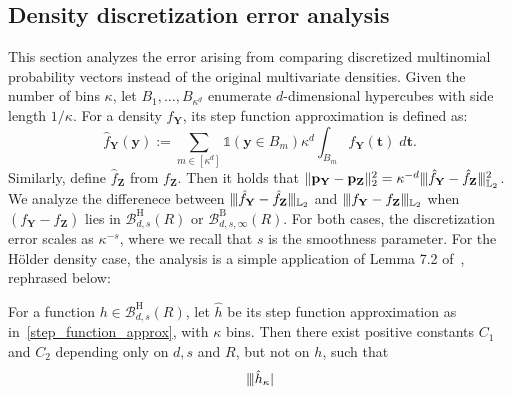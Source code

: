 \documentclass[twoside,11pt]{article}
\newcommand{\Ell}{\mathbb{L}}
\newcommand{\EllTwo}{\Ell_2} %
\newcommand{\rvTwo}{Y}
\newcommand{\rvThree}{Z}
\newcommand{\vectorize}[1]{\mathbf{#1}}
\newcommand{\dimDensity}{d} %
\newcommand{\vectorIndex}{m}
\newcommand{\probVec}{\mathbf{p}} %
\newcommand{\smoothness}{s}
\newcommand{\ballRadius}{R}
\newcommand{\binNum}{\kappa}           %
\newcommand{\ballDistn}{\mathcal{B}}
\newcommand{\besovBall}[2]{\ballDistn_{\dimDensity,\smoothness, #2}^{\mathrm{B}}(\ballRadius)}
\newcommand{\holderBall}{\ballDistn_{\dimDensity, \smoothness}^{\mathrm{H}}(\ballRadius)} %
\begin{document}
\begin{appendix}
	\subsection{Density discretization error analysis}\label{appendix:disc_error}
	This section analyzes the error arising from comparing discretized multinomial probability vectors instead of the original multivariate densities.
	Given the number of bins $\binNum$, let ${B_1, \dots, B_{\binNum^{\dimDensity}}}$ enumerate  $\dimDensity$-dimensional hypercubes with side length $1/\binNum$. For a density $f_{\vectorize{Y}}$, its step function approximation is defined as:
	\begin{equation}\label{step_function_approx}
		\hat{f}_{\vectorize{Y}}(\vectorize{y})
		:=
		\sum_{ \vectorIndex \in [\binNum^\dimDensity] }
		\mathds{1}(\mathbf{y} \in B_\vectorIndex)
		\binNum^\dimDensity
		\int_{
			B_\vectorIndex
		}
		f_{\vectorize{Y}}(\vectorize{t})\;
		d\vectorize{t}.
	\end{equation}
	Similarly, define $\hat{f}_{\vectorize{Z}}$ from $f_{\vectorize{Z}}$. 
	Then it holds that $\| \probVec_{\vectorize{\rvTwo}} - \probVec_{\vectorize{\rvThree}}\|_2^2 = \binNum^{-\dimDensity}
	\vert\kern-0.25ex
	\vert\kern-0.25ex
	\vert
	\hat{f}_{\vectorize{Y}} - \hat{f}_{\vectorize{Z}}
	\vert\kern-0.25ex
	\vert\kern-0.25ex
	\vert_{\EllTwo}
	^2$.
	We analyze the differenece between 
	$\vert\kern-0.25ex
	\vert\kern-0.25ex
	\vert
	\hat{f}_{\vectorize{Y}} - \hat{f}_{\vectorize{Z}}
	\vert\kern-0.25ex
	\vert\kern-0.25ex
	\vert_{\EllTwo}$
	and
	$\vert\kern-0.25ex
	\vert\kern-0.25ex
	\vert
	f_{\vectorize{Y}} - f_{\vectorize{Z}}
	\vert\kern-0.25ex
	\vert\kern-0.25ex
	\vert_{\EllTwo}$
	when $(f_{\vectorize{Y}} - f_{\vectorize{Z}})$ lies in $\holderBall$ or $\besovBall{}{\infty}$.
	For both cases, the discretization error scales as $\binNum^{-\smoothness}$, where we recall that $\smoothness$ is the smoothness parameter. For the H\"{o}lder density case, the analysis is a simple application of  Lemma 7.2 of~\citet{Arias-Castro2018RememberDimension}, rephrased below:
	\begin{lemma}\label{lemma:arias}
		For a function $h \in \holderBall$, let $\hat{h}$ be its step function approximation as in~\eqref{step_function_approx}, with $\kappa$ bins.
		Then there exist positive constants $C_1$ and $C_2$ depending only on $\dimDensity, \smoothness$ and  $\ballRadius$, but not on $h$, such that
		\begin{align*}
			\vert\kern-0.25ex
			\vert\kern-0.25ex
			\vert 
			\hat{h}_\binNum
			\vert\kern-0.25ex

\end{align*}
\end{lemma}
\end{appendix}
\end{document}
